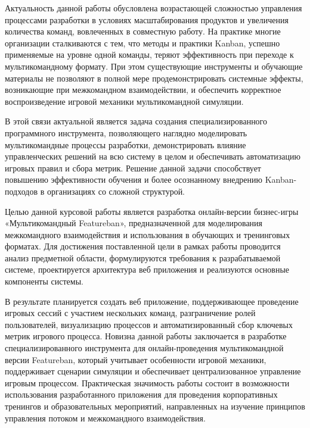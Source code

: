 Актуальность данной работы обусловлена возрастающей сложностью управления процессами разработки в условиях масштабирования продуктов и увеличения количества команд, вовлеченных в совместную работу. На практике многие организации сталкиваются с тем, что методы и практики Kanban, успешно применяемые на уровне одной команды, теряют эффективность при переходе к мультикомандному формату. При этом существующие инструменты и обучающие материалы не позволяют в полной мере продемонстрировать системные эффекты, возникающие при межкомандном взаимодействии, и обеспечить корректное воспроизведение игровой механики мультикомандной симуляции.

В этой связи актуальной является задача создания специализированного программного инструмента, позволяющего наглядно моделировать мультикомандные процессы разработки, демонстрировать влияние управленческих решений на всю систему в целом и обеспечивать автоматизацию игровых правил и сбора метрик. Решение данной задачи способствует повышению эффективности обучения и более осознанному внедрению Kanban-подходов в организациях со сложной структурой.

Целью данной курсовой работы является разработка онлайн-версии бизнес-игры «Мультикомандный Featureban», предназначенной для моделирования межкомандного взаимодействия и использования в обучающих и тренинговых форматах. Для достижения поставленной цели в рамках работы проводится анализ предметной области, формулируются требования к разрабатываемой системе, проектируется архитектура веб приложения и реализуются основные компоненты системы.

В результате планируется создать веб приложение, поддерживающее проведение игровых сессий с участием нескольких команд, разграничение ролей пользователей, визуализацию процессов и автоматизированный сбор ключевых метрик игрового процесса. Новизна данной работы заключается в разработке специализированного инструмента для онлайн-проведения мультикомандной версии Featureban, который учитывает особенности игровой механики, поддерживает сценарии симуляции и обеспечивает централизованное управление игровым процессом. Практическая значимость работы состоит в возможности использования разработанного приложения для проведения корпоративных тренингов и образовательных мероприятий, направленных на изучение принципов управления потоком и межкомандного взаимодействия.